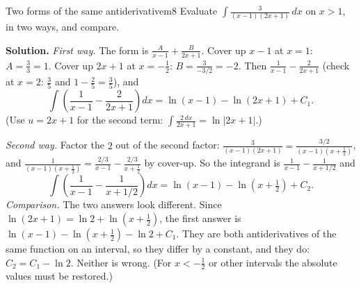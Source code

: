 \documentclass[11pt]{article}
\begin{document}
\begin{exmp}{Two forms of the same antiderivative}{m8}
Evaluate $\displaystyle\int\frac{3}{(x-1)(2x+1)}\,dx$ on $x>1$, in two ways, and compare.

\textbf{Solution.} \emph{First way.} The form is $\frac A{x-1}+\frac B{2x+1}$. Cover up $x-1$ at $x=1$: $A=\frac3{3}=1$. Cover up $2x+1$ at $x=-\frac12$: $B=\frac3{-3/2}=-2$. Then $\frac1{x-1}-\frac2{2x+1}$ (check at $x=2$: $\frac3{5}$ and $1-\frac25=\frac35$), and
\[\int\left(\frac1{x-1}-\frac2{2x+1}\right)dx=\ln(x-1)-\ln(2x+1)+C_1 .\]
(Use $u=2x+1$ for the second term: $\int\frac{2\,dx}{2x+1}=\ln\lvert2x+1\rvert$.)

\emph{Second way.} Factor the $2$ out of the second factor: $\frac3{(x-1)(2x+1)}=\frac{3/2}{(x-1)(x+\frac12)}$, and $\frac1{(x-1)(x+\frac12)}=\frac{2/3}{x-1}-\frac{2/3}{x+\frac12}$ by cover-up. So the integrand is $\frac1{x-1}-\frac1{x+1/2}$ and
\[\int\left(\frac1{x-1}-\frac1{x+1/2}\right)dx=\ln(x-1)-\ln\left(x+\tfrac12\right)+C_2 .\]
\emph{Comparison.} The two answers look different. Since $\ln(2x+1)=\ln2+\ln\left(x+\frac12\right)$, the first answer is $\ln(x-1)-\ln\left(x+\frac12\right)-\ln2+C_1$. They are both antiderivatives of the same function on an interval, so they differ by a constant, and they do: $C_2=C_1-\ln2$. Neither is wrong. (For $x<-\frac12$ or other intervals the absolute values must be restored.)
\end{exmp}
\end{document}
